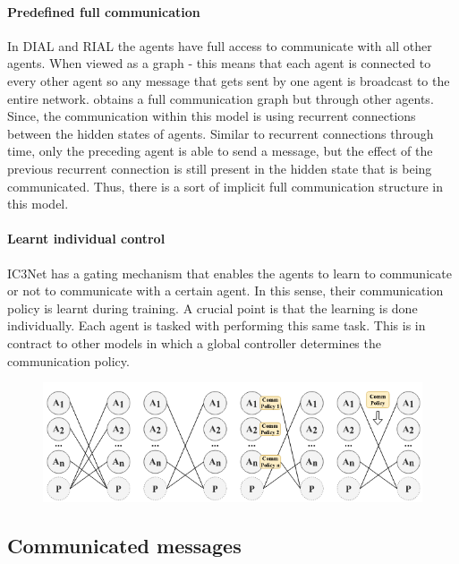 \documentclass{article}
\begin{document}
\paragraph{Predefined full communication} In DIAL and RIAL \citet{foerster2016learning} the agents have full access to communicate with all other agents. When viewed as a graph - this means that each agent is connected to every other agent so any message that gets sent by one agent is broadcast to the entire network. \citet{chuster1997Bidirectional} obtains a full communication graph but through other agents. Since, the communication within this model is using recurrent connections between the hidden states of agents. Similar to recurrent connections through time, only the preceding agent is able to send a message, but the effect of the previous recurrent connection is still present in the hidden state that is being communicated. Thus, there is a sort of implicit full communication structure in this model. 

\paragraph{Learnt individual control} IC3Net \citep{singh2018ic3net} has a gating mechanism that enables the agents to learn to communicate or not to communicate with a certain agent. In this sense, their communication policy is learnt during training. A crucial point is that the learning is done individually. Each agent is tasked with performing this same task. This is in contract to other models in which a global controller determines the communication policy. 

\begin{figure}
	\centering
	\includegraphics[scale=0.5]{images/communication_policies.png}
	\caption{\citet{zhu2024survey}}
	\label{fig:communication_policies}
\end{figure}

\subsection{Communicated messages}
\end{document}
